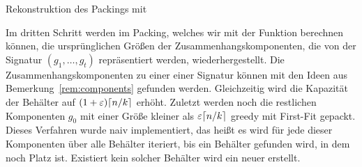 \begin{algorithm}
    \caption{Rekonstruktion des Packings mit }
    \label{alg:bapa}
    \begin{algorithmic}[1]
             
                 
            \EndFor
        \EndFunction
    \end{algorithmic}
\end{algorithm}

 Im dritten Schritt werden im Packing, welches wir mit der Funktion  berechnen können, die ursprünglichen Größen der Zusammenhangskomponenten, die von der Signatur $(g_1, \ldots, g_t)$ repräsentiert werden, wiederhergestellt. 
Die Zusammenhangskomponenten zu einer einer Signatur können mit den Ideen aus Bemerkung~\ref{rem:components} gefunden werden.
Gleichzeitig wird die Kapazität der Behälter auf $(1+\varepsilon)\lceil n/k\rceil$ erhöht.
Zuletzt werden noch die restlichen Komponenten $g_0$ mit einer Größe kleiner als $\varepsilon \lceil n/k\rceil$ greedy mit First-Fit gepackt.
 Dieses Verfahren wurde naiv implementiert, das heißt es wird für jede dieser Komponenten über alle Behälter iteriert, bis ein Behälter gefunden wird, in dem noch Platz ist.
Existiert kein solcher Behälter wird ein neuer erstellt.

